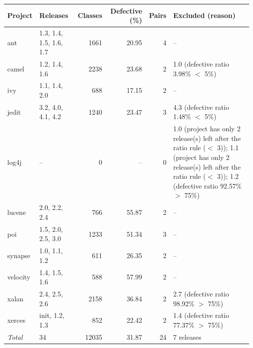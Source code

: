 \small
\begin{tabular}{llrrrp{5.2cm}}
\toprule
Project & Releases & Classes & Defective (\%) & Pairs & Excluded (reason) \\
\midrule
ant & 1.3, 1.4, 1.5, 1.6, 1.7 & 1661 & 20.95 & 4 & -- \\
camel & 1.2, 1.4, 1.6 & 2238 & 23.68 & 2 & 1.0 (defective ratio 3.98\% $<$ 5\%) \\
ivy & 1.1, 1.4, 2.0 & 688 & 17.15 & 2 & -- \\
jedit & 3.2, 4.0, 4.1, 4.2 & 1240 & 23.47 & 3 & 4.3 (defective ratio 1.48\% $<$ 5\%) \\
log4j & -- & 0 & -- & 0 & 1.0 (project has only 2 release(s) left after the ratio rule ($<$ 3)); 1.1 (project has only 2 release(s) left after the ratio rule ($<$ 3)); 1.2 (defective ratio 92.57\% $>$ 75\%) \\
lucene & 2.0, 2.2, 2.4 & 766 & 55.87 & 2 & -- \\
poi & 1.5, 2.0, 2.5, 3.0 & 1233 & 51.34 & 3 & -- \\
synapse & 1.0, 1.1, 1.2 & 611 & 26.35 & 2 & -- \\
velocity & 1.4, 1.5, 1.6 & 588 & 57.99 & 2 & -- \\
xalan & 2.4, 2.5, 2.6 & 2158 & 36.84 & 2 & 2.7 (defective ratio 98.92\% $>$ 75\%) \\
xerces & init, 1.2, 1.3 & 852 & 22.42 & 2 & 1.4 (defective ratio 77.37\% $>$ 75\%) \\
\textit{Total} & 34 & 12035 & 31.87 & 24 & 7 releases \\
\bottomrule
\end{tabular}
